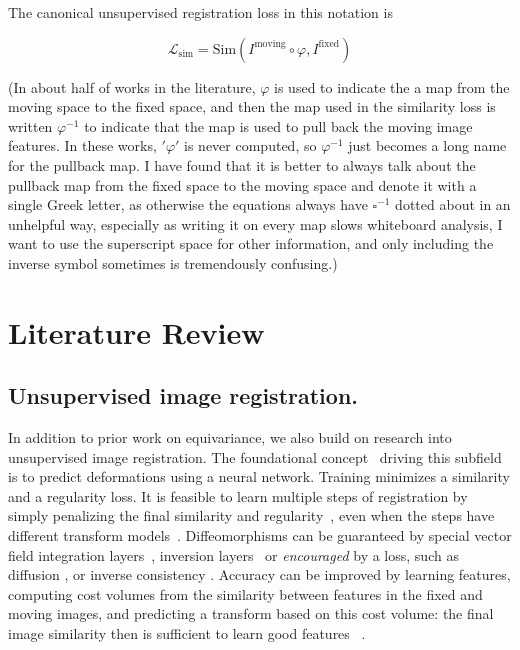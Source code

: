 \documentclass{article}
\begin{document}
The canonical unsupervised registration loss in this notation is

$$\mathcal{L}_\text{sim} = \text{Sim}(I^\text{moving} \circ  \varphi , I^\text{fixed}) $$

(In about half of works in the literature, $\varphi$ is used to indicate the a map from the moving space to the fixed space, and then the map used in the similarity loss is written $\varphi^{-1}$ to indicate that the map is used to pull back the moving image features. In these works, $'\varphi'$ is never computed, so $\varphi^{-1}$ just becomes a long name for the pullback map. I have found that it is better to always talk about the pullback map from the fixed space to the moving space and denote it with a single Greek letter, as otherwise the equations always have $\square^{-1}$ dotted about in an unhelpful way, especially as writing it on every map slows whiteboard analysis, I want to use the superscript space for other information, and only including the inverse symbol sometimes is tremendously confusing.)

\section{Literature Review}

\subsection{Unsupervised image registration.}
In addition to prior work on equivariance, we also build on research into unsupervised image registration. The foundational concept~\cite{balakrishnan2019voxelmorph} driving this subfield is to predict deformations using a neural network. Training minimizes a similarity and a regularity loss. It is feasible to learn multiple steps of registration by simply penalizing the final similarity and regularity~\cite{shen2019networks, greer2021icon, tian2022}, even when the steps have different transform models~\cite{greer2023inverse, shen2019networks}. Diffeomorphisms can be guaranteed by special vector field integration layers~\cite{dalca2018unsupervised}, inversion layers~\cite{asymreg} or \emph{encouraged} by a loss, such as diffusion \cite{balakrishnan2019voxelmorph, shen2019networks}, or inverse consistency \cite{greer2021icon, tian2022}. Accuracy can be improved by learning features, computing cost volumes from the similarity between features in the fixed and moving images, and predicting a transform based on this cost volume: the final image similarity then is sufficient to learn good features~
\cite{mok2020large}.
\end{document}
